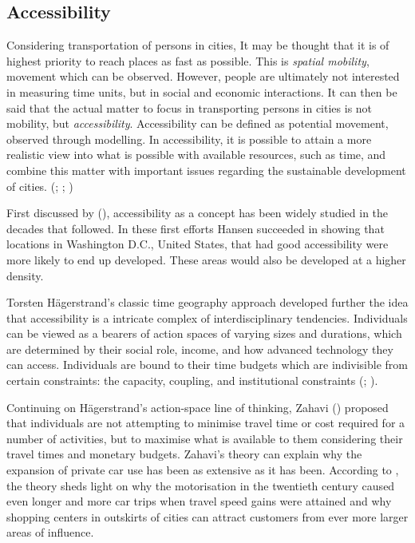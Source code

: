 \newpage
\subsection{Accessibility}
\justify

Considering transportation of persons in cities, It may be thought that it is of highest priority to reach places as fast as possible. This is \textit{spatial mobility}, movement which can be observed. However, people are ultimately not interested in measuring time units, but in social and economic interactions. It can then be said that the actual matter to focus in transporting persons in cities is not mobility, but \textit{accessibility}. Accessibility can be defined as potential movement, observed through modelling. In accessibility, it is possible to attain a more realistic view into what is possible with available resources, such as time, and combine this matter with important issues regarding the sustainable development of cities. (\cite{Hodge1997}; \cite{Tenkanen2017}; \cite{Cervero2017})

First discussed by \citeauthor{Hansen1959} (\citeyear{Hansen1959}), accessibility as a concept has been widely studied in the decades that followed. In these first efforts Hansen succeeded in showing that locations in Washington D.C., United States, that had good accessibility were more likely to end up developed. These areas would also be developed at a higher density.

Torsten Hägerstrand's classic time geography approach developed further the idea that accessibility is a intricate complex of interdisciplinary tendencies. Individuals can be viewed as a bearers of action spaces of varying sizes and durations, which are determined by their social role, income, and how advanced technology they can access. Individuals are bound to their time budgets which are indivisible from certain constraints: the capacity, coupling, and institutional constraints (\cite{Wegener1999}; \cite{Hagerstrand1970}).

Continuing on Hägerstrand's action-space line of thinking, Zahavi (\citeyear{Zahavi1974}) proposed that individuals are not attempting to minimise travel time or cost required for a number of activities, but to maximise what is available to them considering their travel times and monetary budgets. Zahavi's theory can explain why the expansion of private car use has been as extensive as it has been. According to , the theory sheds light on why the motorisation in the twentieth century caused even longer and more car trips when travel speed gains were attained and why shopping centers in outskirts of cities can attract customers from ever more larger areas of influence.


